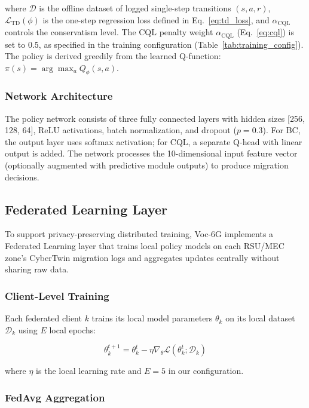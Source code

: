 \documentclass[10pt,letterpaper]{article}
\providecommand{\VocSixG}{Voc-6G}
\begin{document}
where $\mathcal{D}$ is the offline dataset of logged single-step transitions $(s, a, r)$, $\mathcal{L}_{\text{TD}}(\phi)$ is the one-step regression loss defined in Eq.~\ref{eq:td_loss}, and $\alpha_{\text{CQL}}$ controls the conservatism level. The CQL penalty weight $\alpha_{\text{CQL}}$ (Eq.~\ref{eq:cql}) is set to 0.5, as specified in the training configuration (Table~\ref{tab:training_config}). The policy is derived greedily from the learned Q-function: $\pi(s) = \arg\max_a Q_\phi(s, a)$.

\subsubsection{Network Architecture}

The policy network consists of three fully connected layers with hidden sizes [256, 128, 64], ReLU activations, batch normalization, and dropout ($p=0.3$). For BC, the output layer uses softmax activation; for CQL, a separate Q-head with linear output is added. The network processes the 10-dimensional input feature vector (optionally augmented with predictive module outputs) to produce migration decisions.

\subsection*{Federated Learning Layer}
\label{sec:federated}

To support privacy-preserving distributed training, \VocSixG{} implements a Federated Learning layer that trains local policy models on each RSU/MEC zone's CyberTwin migration logs and aggregates updates centrally without sharing raw data.

\subsubsection{Client-Level Training}

Each federated client $k$ trains its local model parameters $\theta_k$ on its local dataset $\mathcal{D}_k$ using $E$ local epochs:

\begin{equation}
\theta_k^{t+1} = \theta_k^t - \eta \nabla_\theta \mathcal{L}(\theta_k^t; \mathcal{D}_k)
\end{equation}

where $\eta$ is the local learning rate and $E=5$ in our configuration.

\subsubsection{FedAvg Aggregation}
\end{document}
